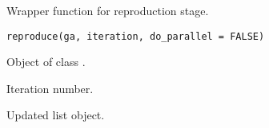 %
\begin{Description}\relax
Wrapper function for reproduction stage.
\end{Description}
%
\begin{Usage}
\begin{verbatim}
reproduce(ga, iteration, do_parallel = FALSE)
\end{verbatim}
\end{Usage}
%
\begin{Arguments}
\begin{ldescription}
\item[\code{ga}] Object of class .

\item[\code{iteration}] Iteration number.
\end{ldescription}
\end{Arguments}
%
\begin{Value}
Updated  list object.
\end{Value}
